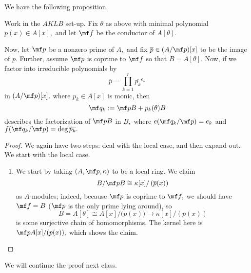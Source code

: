We have the following proposition.
\begin{proposition}
	Work in the $AKLB$ set-up. Fix $\theta$ as above with minimal polynomial $p(x)\in A[x],$ and let $\mf f$ be the conductor of $A[\theta].$

	Now, let $\mf p$ be a nonzero prime of $A,$ and fix $\overline p\in(A/\mf p)[x]$ to be the image of $p.$ Further, assume $\mf p$ is coprime to $\mf f$ so that $B=A[\theta].$ Now, if we factor into irreducible polynomials by
	\[\overline p=\prod_{k=1}^r\overline{p_k}^{e_k}\]
	in $(A/\mf p)[x],$ where $p_k\in A[x]$ is monic, then
	\[\mf q_k:=\mf pB+p_k(\theta)B\]
	describes the factorization of $\mf pB$ in $B,$ where $e(\mf q_k/\mf p)=e_k$ and $f(\mf q_k/\mf p)=\deg\overline{p_k}.$
\end{proposition}
\begin{proof}
	We again have two steps: deal with the local case, and then expand out. We start with the local case.
	\begin{enumerate}
		\item We start by taking $(A,\mf p,\kappa)$ to be a local ring. We claim
		\[B/\mf pB\cong\kappa[x]/\left(\overline p(x)\right)\]
		as $A$-modules; indeed, because $\mf p$ is coprime to $\mf f,$ we should have $\mf f=B$ ($\mf p$ is the only prime lying around)\todo{}, so
		\[B=A[\theta]\cong A[x]/\big(p(x)\big)\to\kappa[x]/\left(\overline p(x)\right)\]
		is some surjective chain of homomorphisms. The kernel here is $\mf pA[x]/(p(x)),$ which shows the claim.
		\qedhere
	\end{enumerate}
\end{proof}
We will continue the proof next class.
